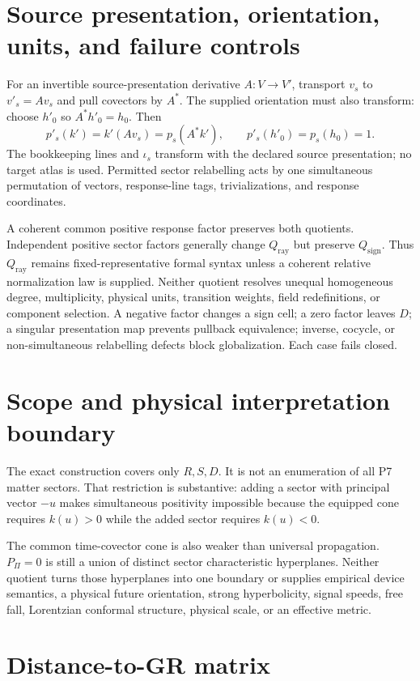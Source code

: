\documentclass[11pt]{article}
\newcommand{\Qray}{Q_{\mathrm{ray}}}
\newcommand{\Qsign}{Q_{\mathrm{sign}}}
\begin{document}
\section{Source presentation, orientation, units, and failure controls}

For an invertible source-presentation derivative $A:V\to V'$, transport
$v_s$ to $v'_s=Av_s$ and pull covectors by $A^*$.  The supplied orientation
must also transform: choose $h'_0$ so $A^*h'_0=h_0$.  Then
\[
 p'_s(k')=k'(Av_s)=p_s(A^*k'),
 \qquad
 p'_s(h'_0)=p_s(h_0)=1.
\]
The bookkeeping lines and $\iota_s$ transform with the declared source
presentation; no target atlas is used.  Permitted sector relabelling acts by
one simultaneous permutation of vectors, response-line tags, trivializations,
and response coordinates.

A coherent common positive response factor preserves both quotients.
Independent positive sector factors generally change $\Qray$ but preserve
$\Qsign$.  Thus $\Qray$ remains fixed-representative formal syntax unless a
coherent relative normalization law is supplied.  Neither quotient resolves
unequal homogeneous degree, multiplicity, physical units, transition weights,
field redefinitions, or component selection.  A negative factor changes a sign
cell; a zero factor leaves $D$; a singular presentation map prevents pullback
equivalence; inverse, cocycle, or non-simultaneous relabelling defects block
globalization.  Each case fails closed.

\section{Scope and physical interpretation boundary}

The exact construction covers only $R,S,D$.  It is not an enumeration of all
P7 matter sectors.  That restriction is substantive: adding a sector with
principal vector $-u$ makes simultaneous positivity impossible because the
equipped cone requires $k(u)>0$ while the added sector requires $k(u)<0$.

The common time-covector cone is also weaker than universal propagation.
$P_\Pi=0$ is still a union of distinct sector characteristic hyperplanes.
Neither quotient turns those hyperplanes into one boundary or supplies
empirical device semantics, a physical future orientation, strong
hyperbolicity, signal speeds, free fall, Lorentzian conformal structure,
physical scale, or an effective metric.

\section{Distance-to-GR matrix}
\end{document}
